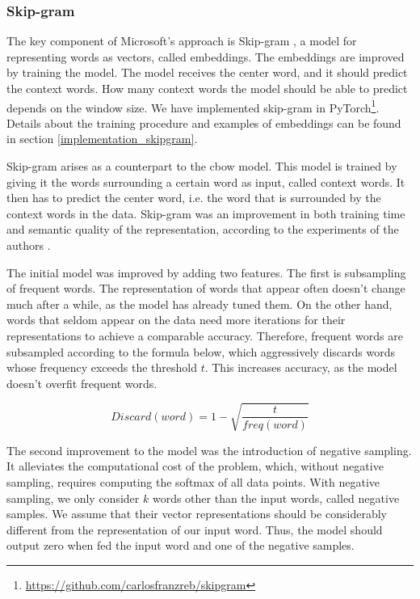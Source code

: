 \subsubsection{Skip-gram} \label{mag_skipgram}

The key component of Microsoft's approach is Skip-gram \cite{mikolov2013distributed}, a model for representing words as vectors, called embeddings. The embeddings are improved by training the model. The model receives the center word, and it should predict the context words. How many context words the model should be able to predict depends on the window size. We have implemented skip-gram in PyTorch\footnote{\url{https://github.com/carlosfranzreb/skipgram}}. Details about the training procedure and examples of embeddings can be found in section \ref{implementation_skipgram}.

Skip-gram arises as a counterpart to the \acrfull{cbow} model. This model is trained by giving it the words surrounding a certain word as input, called context words. It then has to predict the center word, i.e. the word that is surrounded by the context words in the data. Skip-gram was an improvement in both training time and semantic quality of the representation, according to the experiments of the authors \cite{mikolov2013efficient}.

The initial model was improved by adding two features. The first is subsampling of frequent words. The representation of words that appear often doesn't change much after a while, as the model has already tuned them. On the other hand, words that seldom appear on the data need more iterations for their representations to achieve a comparable accuracy. Therefore, frequent words are subsampled according to the formula below, which aggressively discards words whose frequency exceeds the threshold $t$. This increases accuracy, as the model doesn't overfit frequent words.

$$ Discard(word) = 1 - \sqrt{\frac{t}{freq(word)}} $$

The second improvement to the model was the introduction of negative sampling. It alleviates the computational cost of the problem, which, without negative sampling, requires computing the softmax of all data points. With negative sampling, we only consider $k$ words other than the input words, called negative samples. We assume that their vector representations should be considerably different from the representation of our input word. Thus, the model should output zero when fed the input word and one of the negative samples.